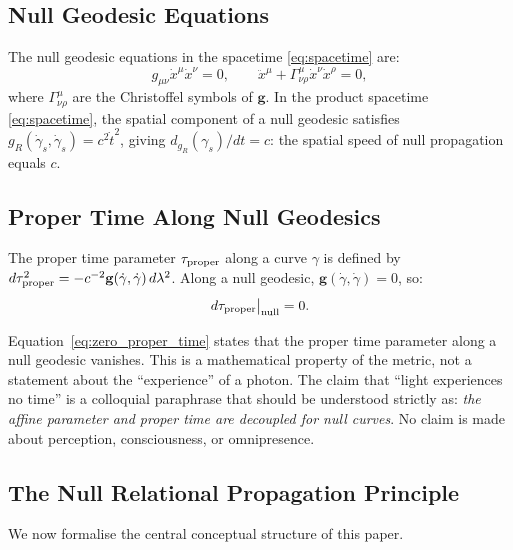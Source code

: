 \documentclass[12pt,a4paper]{article}
\theoremstyle{plain}
\theoremstyle{definition}
\theoremstyle{remark}
\begin{document}
\subsection{Null Geodesic Equations}

The null geodesic equations in the spacetime \eqref{eq:spacetime} are:
\begin{equation}
  g_{\mu\nu}\dot{x}^\mu \dot{x}^\nu = 0,
  \qquad
  \ddot{x}^\mu + \Gamma^\mu_{\nu\rho}\dot{x}^\nu\dot{x}^\rho = 0,
  \label{eq:null_geodesic}
\end{equation}
where $\Gamma^\mu_{\nu\rho}$ are the Christoffel symbols of $\mathbf{g}$.
In the product spacetime \eqref{eq:spacetime}, the spatial component of a null
geodesic satisfies $g_R(\dot\gamma_s, \dot\gamma_s) = c^2 \dot{t}^2$,
giving $d_{g_R}(\gamma_s)/dt = c$: the spatial speed of null propagation equals $c$.

\subsection{Proper Time Along Null Geodesics}

The proper time parameter $\tau_{\rm proper}$ along a curve $\gamma$ is defined by
$d\tau_{\rm proper}^2 = -c^{-2}\mathbf{g}(\dot\gamma,\dot\gamma)\,d\lambda^2$.
Along a null geodesic, $\mathbf{g}(\dot\gamma,\dot\gamma) = 0$, so:
\begin{equation}
  d\tau_{\rm proper}\big|_{\rm null} = 0.
  \label{eq:zero_proper_time}
\end{equation}

\begin{tcolorbox}[remarkbox={Remark 3.1 — Careful Language on Null Propagation}]
Equation~\eqref{eq:zero_proper_time} states that the proper time parameter
along a null geodesic vanishes.
This is a mathematical property of the metric, not a statement about
the ``experience'' of a photon.
The claim that ``light experiences no time'' is a colloquial paraphrase
that should be understood strictly as: \emph{the affine parameter and
proper time are decoupled for null curves}.
No claim is made about perception, consciousness, or omnipresence.
\end{tcolorbox}

\subsection{The Null Relational Propagation Principle}

We now formalise the central conceptual structure of this paper.
\end{document}

